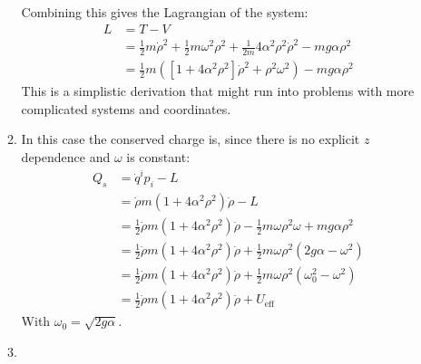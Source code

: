 \documentclass[12pt,a4]{article}
\begin{document}
\begin{enumerate}
\begin{enumerate}
        Combining this gives the Lagrangian of the system:
        \begin{align*}
          L &= T - V\\
            &= \frac{1}{2} m \dot\rho^2 + \frac{1}{2} m \omega^2 \rho^2 + \frac{1}{2m}4 \alpha^2 \rho^2 \dot \rho^2 - mg \alpha \rho^2\\
            &= \frac{1}{2} m \left(\left[1 + 4 \alpha^2 \rho^2\right]\dot\rho^2 + \rho^2\omega^2\right) - mg\alpha\rho^2
        \end{align*}
        This is a simplistic derivation that might run into problems with more complicated systems and coordinates.
      \item
        In this case the conserved charge is, since there is no explicit $z$ dependence and $\omega$ is constant:
        \begin{align*}
          Q_s &= \dot q^ip_i - L\\
              &= \dot\rho m \left(1 + 4 \alpha^2 \rho^2\right)\dot\rho - L \\
              &= \frac{1}{2}\dot\rho m \left(1 + 4 \alpha^2 \rho^2\right)\dot\rho - \frac{1}{2} m\omega \rho^2 \omega + m g \alpha \rho^2 \\
              &= \frac{1}{2}\dot\rho m \left(1 + 4 \alpha^2 \rho^2\right)\dot\rho + \frac{1}{2} m\omega \rho^2 \left(2 g \alpha - \omega^2\right) \\
              &= \frac{1}{2}\dot\rho m \left(1 + 4 \alpha^2 \rho^2\right)\dot\rho + \frac{1}{2} m\omega \rho^2\left(\omega_0^2  - \omega^2\right) \\
              &= \frac{1}{2}\dot\rho m \left(1 + 4 \alpha^2 \rho^2\right)\dot\rho + U_{\text{eff}}
        \end{align*}
        With $\omega_0 = \sqrt{2 g \alpha}$.
      \item
        \begin{center}
        \end{center}
        

\end{enumerate}
\end{enumerate}
\end{document}
